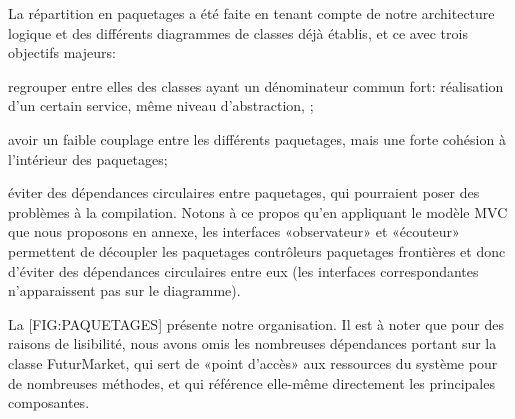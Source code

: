 La répartition en paquetages a été faite en tenant compte de notre architecture logique et des différents diagrammes de classes déjà établis, et ce avec trois objectifs majeurs:

\startitemize[n]
\item regrouper entre elles des classes ayant un dénominateur commun fort: réalisation d'un certain service, même niveau d'abstraction, \etc;
\item avoir un faible couplage entre les différents paquetages, mais une forte cohésion à l'intérieur des paquetages;
\item éviter des dépendances circulaires entre paquetages, qui pourraient poser des problèmes à la compilation. Notons à ce propos qu'en appliquant le modèle MVC que nous proposons en annexe, les interfaces «observateur» et «écouteur» permettent de découpler les paquetages contrôleurs paquetages frontières et donc d'éviter des dépendances circulaires entre eux (les interfaces correspondantes n'apparaissent pas sur le diagramme).
\stopitemize

La [FIG:PAQUETAGES] présente notre organisation.
Il est à noter que pour des raisons de lisibilité, nous avons omis les nombreuses dépendances portant sur la classe FuturMarket, qui sert de «point d'accès» aux ressources du système pour de nombreuses méthodes, et qui référence elle-même directement les principales composantes.

